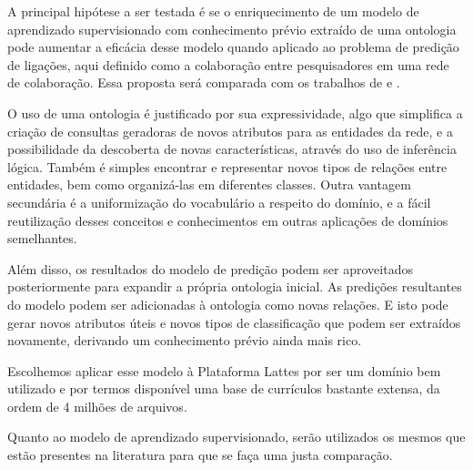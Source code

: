 A principal hipótese a ser testada é se o enriquecimento de um modelo de aprendizado supervisionado com conhecimento prévio extraído de uma ontologia pode aumentar a eficácia desse modelo quando aplicado ao problema de predição de ligações, aqui definido como a colaboração entre pesquisadores em uma rede de colaboração. Essa proposta será comparada com os trabalhos de \citet{MohammadAlHasan} e \cite{Cervantes2014}.

O uso de uma ontologia é justificado por sua expressividade, algo que simplifica a criação de consultas geradoras de novos atributos para as entidades da rede, e a possibilidade da descoberta de novas características, através do uso de inferência lógica. Também é simples encontrar e representar novos tipos de relações entre entidades, bem como organizá-las em diferentes classes. Outra vantagem secundária é a uniformização do vocabulário a respeito do domínio, e a fácil reutilização desses conceitos e conhecimentos em outras aplicações de domínios semelhantes.

Além disso, os resultados do modelo de predição podem ser aproveitados posteriormente para expandir a própria ontologia inicial. As predições resultantes do modelo podem ser adicionadas à ontologia como novas relações. E isto pode gerar novos atributos úteis e novos tipos de classificação que podem ser extraídos novamente, derivando um conhecimento prévio ainda mais rico.

Escolhemos aplicar esse modelo à Plataforma Lattes por ser um domínio bem utilizado e por termos disponível uma base de currículos bastante extensa, da ordem de 4 milhões de arquivos.

Quanto ao modelo de aprendizado supervisionado, serão utilizados os mesmos que estão presentes na literatura para que se faça uma justa comparação.
